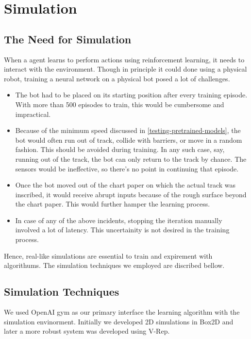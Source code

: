 \documentclass[12pt]{extreport}
\theoremstyle{plain}
\theoremstyle{definition}
\begin{document}
\chapter{Simulation} \label{simulation}

\section{The Need for Simulation} \label{need-for-simulation}
When a agent learns to perform actions using reinforcement learning, it
needs to interact with the environment. Though in principle it could
done using a physical robot, training a neural network on a physical bot posed
a lot of challenges.

\begin{itemize}
 \item The bot had to be placed on its starting position after every training episode. With more than 500 episodes to train, this would be cumbersome and impractical.
 \item Because of the minimum speed discussed in \autoref{testing-pretrained-models}, the bot would often run out of track, collide with barriers, or move in a random fashion. This should be avoided during training. In any such case, say, running out of the track, the bot can only return to the track by chance. The sensors would be ineffective, so there's no point in continuing that episode.
 \item Once the bot moved out of the chart paper on which the actual track was inscribed, it would receive abrupt inputs because of the rough surface beyond the chart paper. This would further hamper the learning process.
 \item In case of any of the above incidents, stopping the iteration manually involved a lot of latency. This uncertainity is not desired in the training process.
\end{itemize}

Hence, real-like simulations are essential to train and expirement with
algorithums. The simulation techniques we employed are discribed bellow.

\section{Simulation Techniques}
We used OpenAI gym as our primary interface the learning algorithm with the simulation envinorment. Initially we developed 2D simulations in Box2D and later a more robust system was developed using V-Rep.
\end{document}
